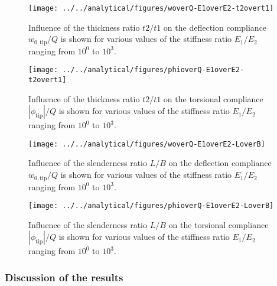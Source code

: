 \begin{figure}[!htpb] %
  \centering
  \texttt{[image: ../../analytical/figures/woverQ-E1overE2-t2overt1]}
  \caption[Influence of the thickness ratio $t2/t1$ on the deflection compliance]{Influence of the thickness ratio $t2/t1$ on the deflection compliance $w_{\mathrm{0,tip}} / Q$ is shown for various values of the stiffness ratio $E_1/E_2$ ranging from $10^0$ to $10^3$. }\label{fig:woverQ-E1overE2-t2overt1}
\end{figure}

\begin{figure}[!htpb] %
  \centering
  \texttt{[image: ../../analytical/figures/phioverQ-E1overE2-t2overt1]}
  \caption[Influence of the thickness ratio $t2/t1$ on the torsional compliance]{Influence of the thickness ratio $t2/t1$ on the torsional compliance $|\phi_{\mathrm{tip}}| / Q$ is shown for various values of the stiffness ratio $E_1/E_2$ ranging from $10^0$ to $10^3$. }\label{fig:phioverQ-E1overE2-t2overt1}
\end{figure}

\begin{figure}[!htpb] %
  \centering
  \texttt{[image: ../../analytical/figures/woverQ-E1overE2-LoverB]}
  \caption[Influence of the slenderness ratio $L/B$ on the deflection compliance]{Influence of the slenderness ratio $L/B$ on the deflection compliance $w_{\mathrm{0,tip}} / Q$ is shown for various values of the stiffness ratio $E_1/E_2$ ranging from $10^0$ to $10^3$. }\label{fig:woverQ-E1overE2-LoverB}
\end{figure}

\begin{figure}[!htpb] %
  \centering
  \texttt{[image: ../../analytical/figures/phioverQ-E1overE2-LoverB]}
  \caption[Influence of the slenderness ratio $L/B$ on the torsional compliance]{Influence of the slenderness ratio $L/B$ on the torsional compliance $|\phi_{\mathrm{tip}}| / Q$ is shown for various values of the stiffness ratio $E_1/E_2$ ranging from $10^0$ to $10^3$. }\label{fig:phioverQ-E1overE2-LoverB}
\end{figure}

\clearpage
\subsubsection{Discussion of the results} \label{subsubsec:disc_results_parametricStudy}

